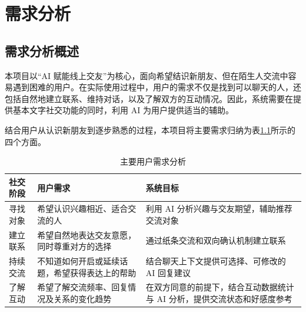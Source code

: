 
\chapter{需求分析}
\label{chap:requirements}

\begingroup
\setlength{\intextsep}{8bp}
\relax
{}\relax

\section{需求分析概述}

本项目以“AI 赋能线上交友”为核心，面向希望结识新朋友、但在陌生人交流中容易遇到困难的用户。在实际使用过程中，用户的需求不仅是找到可以聊天的人，还包括自然地建立联系、维持对话，以及了解双方的互动情况。因此，系统需要在提供基本文字社交功能的同时，利用 AI 为用户提供适当的辅助。

结合用户从认识新朋友到逐步熟悉的过程，本项目将主要需求归纳为表\ref{tab:req-user-needs}所示的四个方面。

\begin{table}[H]
\centering
\small
\caption{主要用户需求分析}
\label{tab:req-user-needs}
\begin{tabularx}{\linewidth}{@{}
>{\raggedright\arraybackslash}p{25mm}
>{\raggedright\arraybackslash}X
>{\raggedright\arraybackslash}X@{}}
\toprule
社交阶段 & 用户需求 & 系统目标 \\
\midrule

寻找对象 &
希望认识兴趣相近、适合交流的人 &
利用 AI 分析兴趣与交友期望，辅助推荐交流对象 \\

建立联系 &
希望自然地表达交友意愿，同时尊重对方的选择 &
通过纸条交流和双向确认机制建立联系 \\

持续交流 &
不知道如何开启或延续话题，希望获得表达上的帮助 &
结合聊天上下文提供可选择、可修改的 AI 回复建议 \\

了解互动 &
希望了解交流频率、回复情况及关系的变化趋势 &
在双方同意的前提下，结合互动数据统计与 AI 分析，提供交流状态和好感度参考 \\

\bottomrule
\end{tabularx}
\end{table}

